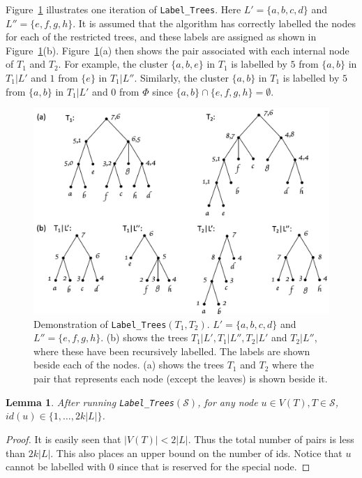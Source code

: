 \documentclass[final,1p,times]{elsarticle}
\newtheorem{lemma}[theorem]{Lemma}
\begin{document}
    Figure~\ref{fig:labelclusters} illustrates one iteration of \texttt{Label\_Trees}. Here $L' = \{a, b, c, d\}$ and $L'' = \{e, f, g, h\}$. It is assumed that the algorithm has correctly labelled the nodes for each of the restricted trees, and these labels are assigned as shown in Figure~\ref{fig:labelclusters}(b). Figure~\ref{fig:labelclusters}(a) then shows the pair associated with each internal node of $T_1$ and $T_2$. For example, the cluster $\{a, b, e\}$ in $T_1$ is labelled by $5$ from $\{a, b\}$ in $T_1|L'$ and $1$ from $\{e\}$ in $T_1|L''$. Similarly, the cluster $\{a, b\}$ in $T_1$ is labelled by $5$ from $\{a, b\}$ in $T_1|L'$ and $0$ from $\Phi$ since $\{a, b\} \cap \{e, f, g, h\} = \emptyset$.

    \begin{figure}[ht]
        \includegraphics[scale=0.5]{labelclusters}
        \centering
        \caption[The \texttt{Label\_Trees} algorithm]{Demonstration of \texttt{Label\_Trees}$(T_1, T_2)$. $L' = \{a, b, c, d\}$ and $L'' = \{e, f, g, h\}$. (b) shows the trees $T_1|L', T_1|L'', T_2|L'$ and $T_2|L''$, where these have been recursively labelled. The labels are shown beside each of the nodes. (a) shows the trees $T_1$ and $T_2$ where the pair that represents each node (except the leaves) is shown beside it.}
        \label{fig:labelclusters}
    \end{figure}

    \bigskip
    \begin{lemma}
        \label{lem:labelclustersidbounds}
	    After running \texttt{Label\_Trees}$(\mathcal{S})$, for any node $u \in V(T), T \in \mathcal{S}$, $id(u) \in \{1, \dots, 2k |L|\}$.
    \end{lemma}
        \begin{proof}
            It is easily seen that $|V(T)| < 2|L|$. Thus the total number of pairs is less than $2k|L|$. This also places an upper bound on the number of ids. Notice that $u$ cannot be labelled with $0$ since that is reserved for the special node.
        \end{proof}
\end{document}
